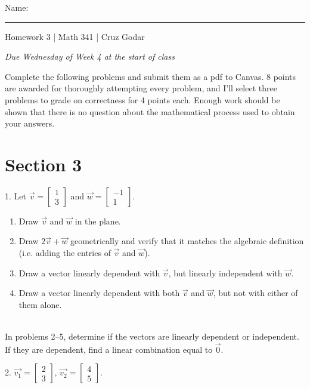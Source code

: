\documentclass{article}
\begin{document}
\Large Name: \rule{2in}{0.15mm} \hfill Homework 3 | Math 341 | Cruz Godar \vspace{4pt}  \normalsize

\textit{Due Wednesday of Week 4 at the start of class}

Complete the following problems and submit them as a pdf to Canvas. 8 points are awarded for thoroughly attempting every problem, and I'll select three problems to grade on correctness for 4 points each. Enough work should be shown that there is no question about the mathematical process used to obtain your answers.

\section{Section 3}

1. Let $\displaystyle \vec{v} = \left[\begin{array}{c} 1 \\ 3 \end{array}\right]$ and $\displaystyle \vec{w} = \left[\begin{array}{c} -1 \\ 1 \end{array}\right]$.

\begin{enumerate}

	\item Draw $\vec{v}$ and $\vec{w}$ in the plane.

	\item Draw $2\vec{v} + \vec{w}$ geometrically and verify that it matches the algebraic definition (i.e. adding the entries of $\vec{v}$ and $\vec{w}$).

	\item Draw a vector linearly dependent with $\vec{v}$, but linearly independent with $\vec{w}$.

	\item Draw a vector linearly dependent with both $\vec{v}$ and $\vec{w}$, but not with either of them alone.

\end{enumerate}

~\\

In problems 2--5, determine if the vectors are linearly dependent or independent. If they are dependent, find a linear combination equal to $\vec{0}$.

2. $\vec{v_1} = \left[\begin{array}{c} 2 \\ 3 \end{array}\right]$, $\vec{v_2} = \left[\begin{array}{c} 4 \\ 5 \end{array}\right]$.
\end{document}
